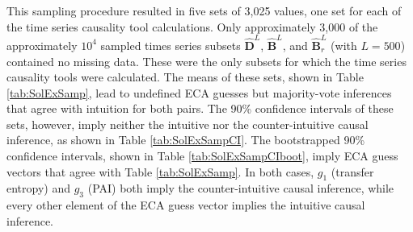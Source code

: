 \documentclass{article}[10pt]
\begin{document}
This sampling procedure resulted in five sets of 3,025 values, one set for each of the time series causality tool calculations.  Only approximately 3,000 of the approximately $10^4$ sampled times series subsets $\hat{\mathbf{D}}^L$, $\hat{\mathbf{B}}^L$, and $\hat{\mathbf{B}}^L_r$ (with $L=500$) contained no missing data.  These were the only subsets for which the time series causality tools were calculated.  The means of these sets, shown in Table \ref{tab:SolExSamp}, lead to undefined ECA guesses but majority-vote inferences that agree with intuition for both pairs. The 90\% confidence intervals of these sets, however, imply neither the intuitive nor the counter-intuitive causal inference, as shown in Table \ref{tab:SolExSampCI}.  The bootstrapped 90\% confidence intervals, shown in Table \ref{tab:SolExSampCIboot}, imply ECA guess vectors that agree with Table \ref{tab:SolExSamp}.  In both cases, $g_1$ (transfer entropy) and $g_3$ (PAI) both imply the counter-intuitive causal inference, while every other element of the ECA guess vector implies the intuitive causal inference. 
\end{document}
